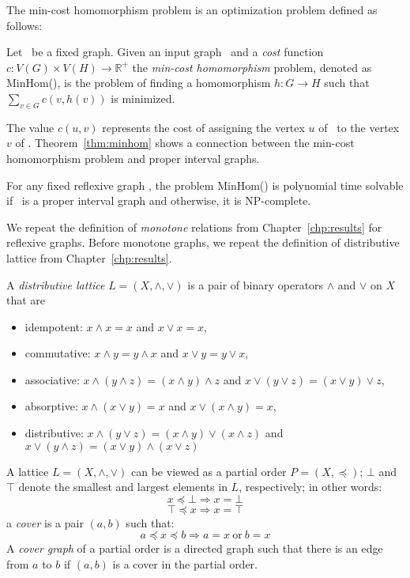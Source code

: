 The min-cost homomorphism problem is an optimization problem defined as follows:

\begin{defi} [MinHom]
Let \mH\ be a fixed graph. Given an input graph \mG\ and a \emph{cost} function
\(c: V(G) \times V(H) \to \mathbb{R}^+\) the \emph{min-cost homomorphism} problem,
denoted as MinHom(\mH), is the problem of finding a homomorphism 
\(h:G\to H\) such that \(\sum_{v\in G} c(v, h(v))\) is minimized.
\end{defi}

The value \(c(u,v)\) represents the cost of assigning the vertex \(u\) of \mG\ to the vertex \(v\) of \mH\@.
Theorem~\ref{thm:minhom} shows a connection between the min-cost homomorphism problem 
and proper interval graphs.

\begin{theorem}  \label{thm:minhom}
For any fixed reflexive graph \mH, the problem MinHom(\mH) is polynomial time solvable if
\mH\ is a proper interval graph and otherwise, it is NP-complete.
\end{theorem}

We repeat the definition of \emph{monotone} relations from Chapter~\ref{chp:results}
for reflexive graphs. Before monotone graphs, we repeat the definition of distributive lattice from Chapter~\ref{chp:results}\@.

\begin{defi} 
A \emph{distributive lattice} \(L=(X,\wedge,\vee)\) is a pair of binary operators \(\wedge\)
and \(\vee\) on \(X\) that are 
\begin{itemize}
\item idempotent: \(x \wedge x = x\) and \(x \vee x = x\),
\item commutative: \(x \wedge y = y \wedge x\) and \(x \vee y = y \vee x\),
\item associative: \(x \wedge (y \wedge z) = (x \wedge y) \wedge z\) and 
\(x \vee (y \vee z) = (x \vee y) \vee z\),
\item absorptive: \(x \wedge (x\vee y) = x\) and \(x \vee (x \wedge y) = x\),
\item distributive: \(x \wedge (y \vee z) = (x \wedge y) \vee (x \wedge z)\) and
\(x \vee (y \wedge z) = (x \vee y) \wedge (x \vee z)\)
\end{itemize}
\end{defi}

A lattice \(L=(X,\wedge,\vee)\) can be viewed as a partial order \(P=(X,\preceq)\);
\(\bot\) and \(\top\) denote the smallest and largest elements in \(L\), respectively; in other words:
\[x \preceq \bot \Rightarrow x = \bot \]
\[\top \preceq x \Rightarrow x = \top \]
a \emph{cover} is a pair \((a,b)\) such that:
\[a \preceq x \preceq b \Rightarrow a = x\ \mathrm{or}\ b = x\]
A \emph{cover graph} of a partial order is a directed graph such that there is
an edge from \(a\) to \(b\) if \((a,b)\) is a cover in the partial order.


